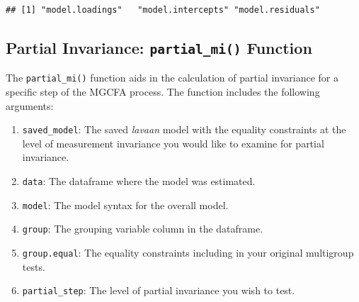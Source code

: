 \documentclass[
  man,floatsintext]{apa7}
\newenvironment{Shaded}{\begin{snugshade}}{\end{snugshade}}
\newcommand{\AttributeTok}[1]{\textcolor[rgb]{0.13,0.29,0.53}{#1}}
\newcommand{\CommentTok}[1]{\textcolor[rgb]{0.56,0.35,0.01}{\textit{#1}}}
\newcommand{\FunctionTok}[1]{\textcolor[rgb]{0.13,0.29,0.53}{\textbf{#1}}}
\newcommand{\NormalTok}[1]{#1}
\newcommand{\OtherTok}[1]{\textcolor[rgb]{0.56,0.35,0.01}{#1}}
\newcommand{\SpecialCharTok}[1]{\textcolor[rgb]{0.81,0.36,0.00}{\textbf{#1}}}
\newcommand{\StringTok}[1]{\textcolor[rgb]{0.31,0.60,0.02}{#1}}
\providecommand{\tightlist}{%
  \setlength{\itemsep}{0pt}\setlength{\parskip}{0pt}}
\begin{document}
\normalsize

\begin{verbatim}
## [1] "model.loadings"   "model.intercepts" "model.residuals"
\end{verbatim}

\newpage

\subsection{\texorpdfstring{Partial Invariance: \texttt{partial\_mi()} Function}{Partial Invariance: partial\_mi() Function}}\label{partial-invariance-partial_mi-function-1}

The \texttt{partial\_mi()} function aids in the calculation of partial invariance for a specific step of the MGCFA process. The function includes the following arguments:

\begin{enumerate}
\def\labelenumi{\arabic{enumi})}
\tightlist
\item
  \texttt{saved\_model}: The saved \emph{lavaan} model with the equality constraints at the level of measurement invariance you would like to examine for partial invariance.
\item
  \texttt{data}: The dataframe where the model was estimated.
\item
  \texttt{model}: The model syntax for the overall model.
\item
  \texttt{group}: The grouping variable column in the dataframe.
\item
  \texttt{group.equal}: The equality constraints including in your original multigroup tests.
\item
  \texttt{partial\_step}: The level of partial invariance you wish to test.
\end{enumerate}

\small

\begin{Shaded}
\end{Shaded}
\end{document}
